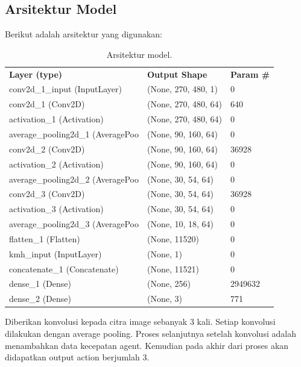 \documentclass[conference]{IEEEtran}
\begin{document}
\subsection{Arsitektur Model}
\label{sec:arsitektur_model}

Berikut adalah arsitektur yang digunakan:

\begin{table}[H]
	\begin{tabular}{lll}
		\textbf{Layer (type)}                      & \textbf{Output Shape}         & \textbf{Param \#} \\
		conv2d\_1\_input (InputLayer)     & (None, 270, 480, 1)  & 0        \\
		conv2d\_1 (Conv2D)                & (None, 270, 480, 64) & 640      \\
		activation\_1 (Activation)        & (None, 270, 480, 64) & 0        \\
		average\_pooling2d\_1 (AveragePoo & (None, 90, 160, 64)  & 0        \\
		conv2d\_2 (Conv2D)                & (None, 90, 160, 64)  & 36928    \\
		activation\_2 (Activation)        & (None, 90, 160, 64)  & 0        \\
		average\_pooling2d\_2 (AveragePoo & (None, 30, 54, 64)   & 0        \\
		conv2d\_3 (Conv2D)                & (None, 30, 54, 64)   & 36928    \\
		activation\_3 (Activation)        & (None, 30, 54, 64)   & 0        \\
		average\_pooling2d\_3 (AveragePoo & (None, 10, 18, 64)   & 0        \\
		flatten\_1 (Flatten)              & (None, 11520)        & 0        \\
		kmh\_input (InputLayer)           & (None, 1)            & 0        \\
		concatenate\_1 (Concatenate)      & (None, 11521)        & 0        \\
		dense\_1 (Dense)                  & (None, 256)          & 2949632  \\
		dense\_2 (Dense)                  & (None, 3)            & 771     
	\end{tabular}
	\caption{Arsitektur model.}
	\label{tb:arsitektur_model}
\end{table}

Diberikan konvolusi kepada citra image sebanyak 3 kali. Setiap konvolusi dilakukan dengan average pooling. Proses selanjutnya setelah konvolusi adalah menambahkan data kecepatan agent. Kemudian pada akhir dari proses akan didapatkan output action berjumlah 3.
\end{document}
